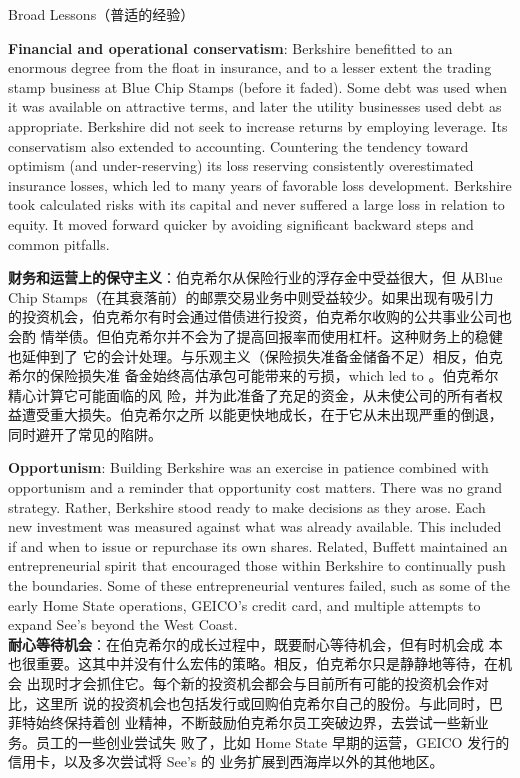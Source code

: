 \begin{section}{Broad Lessons（普适的经验）}
\begin{verseparallel}
  {
    \textbf{Financial and operational conservatism}: Berkshire benefitted to an
    enormous degree from the float in insurance, and to a lesser extent the
    trading stamp business at Blue Chip Stamps (before it faded). Some debt was
    used when it was available on attractive terms, and later the utility
    businesses used debt as appropriate. Berkshire did not seek to increase
    returns by employing leverage. Its conservatism also extended to accounting.
    Countering the tendency toward optimism (and under-reserving) its loss
    reserving consistently overestimated insurance losses, which led to many
    years of favorable loss development. Berkshire took calculated risks with
    its capital and never suffered a large loss in relation to equity. It moved
    forward quicker by avoiding significant backward steps and common pitfalls. \\
  }
  {

    \textbf{财务和运营上的保守主义}：伯克希尔从保险行业的浮存金中受益很大，但
    从Blue Chip Stamps（在其衰落前）的邮票交易业务中则受益较少。如果出现有吸引力
    的投资机会，伯克希尔有时会通过借债进行投资，伯克希尔收购的公共事业公司也会酌
    情举债。但伯克希尔并不会为了提高回报率而使用杠杆。这种财务上的稳健也延伸到了
    它的会计处理。与乐观主义（保险损失准备金储备不足）相反，伯克希尔的保险损失准
    备金始终高估承包可能带来的亏损，which led to 。伯克希尔精心计算它可能面临的风
    险，并为此准备了充足的资金，从未使公司的所有者权益遭受重大损失。伯克希尔之所
    以能更快地成长，在于它从未出现严重的倒退，同时避开了常见的陷阱。

  }
\end{verseparallel}

\begin{verseparallel}
  {
    \textbf{Opportunism}: Building Berkshire was an exercise in patience
    combined with opportunism and a reminder that opportunity cost matters.
    There was no grand strategy. Rather, Berkshire stood ready to make decisions
    as they arose. Each new investment was measured against what was already
    available. This included if and when to issue or repurchase its own shares.
    Related, Buffett maintained an entrepreneurial spirit that encouraged those
    within Berkshire to continually push the boundaries. Some of these
    entrepreneurial ventures failed, such as some of the early Home State
    operations, GEICO's credit card, and multiple attempts to expand See's
    beyond the West Coast. \\
  }
  {
    \textbf{耐心等待机会}：在伯克希尔的成长过程中，既要耐心等待机会，但有时机会成
    本也很重要。这其中并没有什么宏伟的策略。相反，伯克希尔只是静静地等待，在机会
    出现时才会抓住它。每个新的投资机会都会与目前所有可能的投资机会作对比，这里所
    说的投资机会也包括发行或回购伯克希尔自己的股份。与此同时，巴菲特始终保持着创
    业精神，不断鼓励伯克希尔员工突破边界，去尝试一些新业务。员工的一些创业尝试失
    败了，比如 Home State 早期的运营，GEICO 发行的信用卡，以及多次尝试将 See's 的
    业务扩展到西海岸以外的其他地区。
  }
\end{verseparallel}


\end{section}
